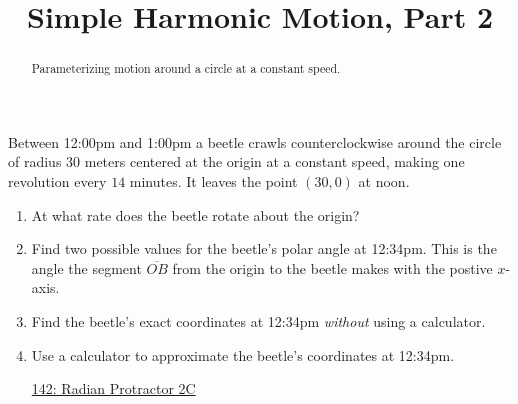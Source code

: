 \documentclass{ximera}
\title{Simple Harmonic Motion, Part 2}
\begin{document}
\begin{abstract}
Parameterizing motion around a circle at a constant speed.
\end{abstract}
\maketitle



\begin{example}  \label{Exp89dfe94tf4}

Between 12:00pm and 1:00pm a beetle crawls counterclockwise around the circle of radius $30$ meters centered at the origin at a constant speed, making one revolution every $14$ minutes.  It leaves the point $(30,0)$ at noon.

\begin{enumerate}

\item At what rate does the beetle rotate about the origin?


\item Find two possible values for the beetle's polar angle at 12:34pm. This is the angle the segment $\overline{OB}$ from the origin to the beetle makes with the postive $x$-axis.

\item Find the beetle's exact coordinates at 12:34pm \emph{without} using a calculator.

\item Use a calculator to approximate the beetle's coordinates at 12:34pm.



\begin{onlineOnly}
    \begin{center}
\end{center}
\end{onlineOnly}

\href{https://www.desmos.com/calculator/lbkveixdno}{142: Radian Protractor 2C}



\end{enumerate}

\end{example}
\end{document}
